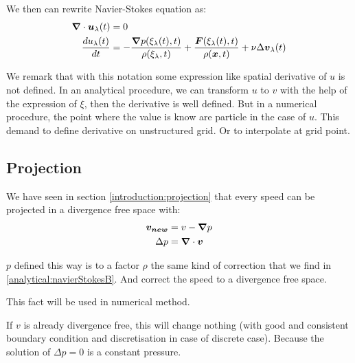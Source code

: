 We then can rewrite Navier-Stokes equation as:
\begin{align}
\label{analytical:navierStokesLagA}
{\boldsymbol {\nabla}} \cdot {\boldsymbol {u}}_{\lambda}(t)&=0\\
\label{analytical:navierStokesLagB}
\frac{d u_{\lambda}(t)}{d t}&=-\frac{{\boldsymbol {\nabla}} p(\xi_{\lambda}(t),t)}{\rho(\xi_{\lambda},t)}+\frac{{\boldsymbol {F}}(\xi_{\lambda}(t),t)}{\rho({\boldsymbol {x}},t)}+\nu \Delta {\boldsymbol {v}}_{\lambda}(t)
\end{align}

\begin{rem}
We remark that with this notation some expression like spatial derivative of $u$ is not defined.
In an analytical procedure, we can transform $u$ to $v$ with the help of the expression of $\xi$, then the derivative is well defined.
But in a numerical procedure, the point where the value is know are particle in the case of $u$. This demand to define derivative on unstructured grid.
Or to interpolate at grid point.
\end{rem}

\subsection{Projection}

We have seen in section \ref{introduction:projection} that every speed can be projected in a divergence free space with:
\begin{align}
 {\boldsymbol {v_{new}}}&=v-{\boldsymbol {\nabla}}p\\
 \Delta p&={\boldsymbol {\nabla}} \cdot {\boldsymbol {v}}
\end{align}

$p$ defined this way is to a factor $\rho$ the same kind of correction that we find in \ref{analytical:navierStokesB}.
And correct the speed to a divergence free space.

This fact will be used in numerical method.

If $v$ is already divergence free, this will change nothing (with good and consistent boundary condition and discretisation in case of discrete case).
Because the solution of $\Delta p=0$ is a constant pressure.

